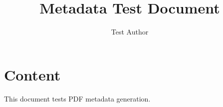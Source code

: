 \documentclass{article}
\title{Metadata Test Document}
\author{Test Author}
\begin{document}
\section{Content}
This document tests PDF metadata generation.
\end{document}
